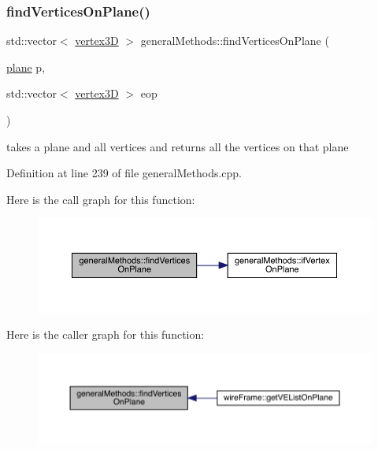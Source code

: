 \subsubsection{\texorpdfstring{find\+Vertices\+On\+Plane()}{findVerticesOnPlane()}}
{\footnotesize\ttfamily std\+::vector$<$ \mbox{\hyperlink{structvertex3_d}{vertex3D}} $>$ general\+Methods\+::find\+Vertices\+On\+Plane (\begin{DoxyParamCaption}\item[{\mbox{\hyperlink{structplane}{plane}}}]{p,  }\item[{std\+::vector$<$ \mbox{\hyperlink{structvertex3_d}{vertex3D}} $>$}]{eop }\end{DoxyParamCaption})}

takes a plane and all vertices and returns all the vertices on that plane 

Definition at line 239 of file general\+Methods.\+cpp.

Here is the call graph for this function\+:
\nopagebreak
\begin{figure}[H]
\begin{center}
\leavevmode
\includegraphics[width=350pt]{namespacegeneral_methods_aa0669678cf59876e3249ddce7a0d1ce3_cgraph}
\end{center}
\end{figure}
Here is the caller graph for this function\+:
\nopagebreak
\begin{figure}[H]
\begin{center}
\leavevmode
\includegraphics[width=350pt]{namespacegeneral_methods_aa0669678cf59876e3249ddce7a0d1ce3_icgraph}
\end{center}
\end{figure}
\mbox{\label{namespacegeneral_methods_a0bd9c59442b6f9c7fd3ae00832ee30df}} 
